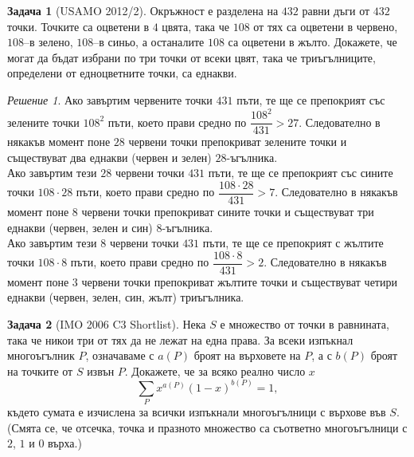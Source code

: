 \documentclass[11 pt, a4paper]{article}
\theoremstyle{definition}
\newtheorem{p}{Задача}
\theoremstyle{remark}
\newtheorem*{s}{Решение}
\begin{document}
\begin{p}[USAMO 2012/2]
Окръжност е разделена на $432$ равни дъги от $432$ точки. Точките са оцветени в $4$ цвята, така че $108$ от тях са оцветени в червено, $108$--в зелено, $108$--в синьо, а останалите $108$ са оцветени в жълто. Докажете, че могат да бъдат избрани по три точки от всеки цвят, така че триъгълниците, определени от едноцветните точки, са еднакви. 
\end{p}
\begin{s}
Ако завъртим червените точки $431$ пъти, те ще се препокрият със зелените точки $108^2$ пъти, което прави средно по $\dfrac{108^2}{431}>27$. Следователно в някакъв момент поне $28$ червени точки препокриват зелените точки и съществуват два еднакви (червен и зелен) $28$-ъгълника.\\
Ако завъртим тези $28$ червени точки $431$ пъти, те ще се препокрият със сините точки $108\cdot28$ пъти, което прави средно по $\dfrac{108\cdot28}{431}>7$. Следователно в някакъв момент поне $8$ червени точки препокриват сините точки и съществуват три еднакви (червен, зелен и син) $8$-ъгълника.\\
Ако завъртим тези $8$ червени точки $431$ пъти, те ще се препокрият с жълтите точки $108\cdot8$ пъти, което прави средно по $\dfrac{108\cdot8}{431}>2$. Следователно в някакъв момент поне $3$ червени точки препокриват жълтите точки и съществуват четири еднакви (червен, зелен, син, жълт) триъгълника.\\
\end{s}
\begin{p}[IMO 2006 C3 Shortlist]
Нека $S$ е множество от точки в равнината, така че никои три от тях да не лежат на една  права. За всеки изпъкнал многоъгълник $P$, означаваме с $a(P)$ броят на върховете на $P$, а с $b(P)$ броят на точките от $S$ извън $P$. Докажете, че за всяко реално число $x$
\begin{equation*}
\sum_{P}x^{a(P)}(1-x)^{b(P)}=1,
\end{equation*}
където сумата е изчислена за всички изпъкнали многоъгълници с върхове във $S$.(Смята се, че отсечка, точка и празното множество са съответно многоъгълници с $2$, $1$ и $0$ върха.)
\end{p}
\end{document}
